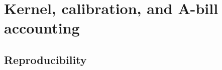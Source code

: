 \section{Kernel, calibration, and A-bill accounting}\label{app:kernel}


\subsection*{Reproducibility}
